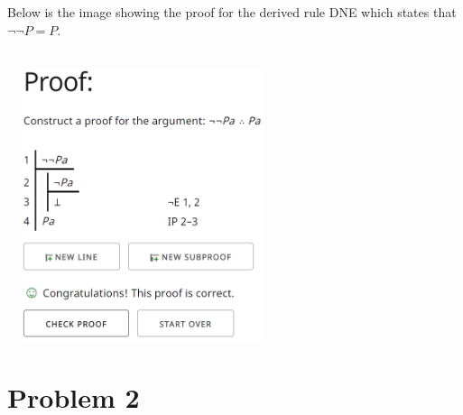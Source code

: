 \documentclass{article}
\begin{document}
\begin{flushleft}
Below is the image showing the proof for the derived rule DNE which states that $\neg\neg P = P$.\\
\begin{centering}\hspace*{1pt}\\\includegraphics[width=300px, height = 300px]{p1.png}\end{centering}
\end{flushleft}
\newpage
\section{Problem 2}
\end{document}
